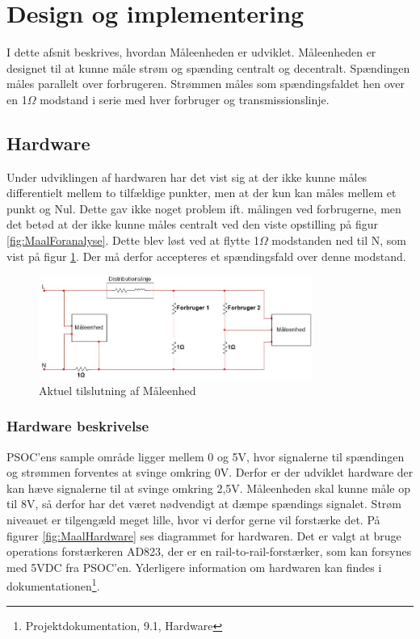 
\section{Design og implementering}
I dette afsnit beskrives, hvordan Måleenheden er udviklet. Måleenheden er designet til at kunne måle strøm og spænding centralt og decentralt. Spændingen måles parallelt over forbrugeren. Strømmen måles som spændingsfaldet hen over en 1$\Omega$ modstand i serie med hver forbruger og transmissionslinje. 

\subsection{Hardware}

Under udviklingen af hardwaren har det vist sig at der ikke kunne måles differentielt mellem to tilfældige punkter, men at der kun kan måles mellem et punkt og Nul. Dette gav ikke noget problem ift. målingen ved forbrugerne, men det betød at der ikke kunne måles centralt ved den viste opstilling på figur \ref{fig:MaalForanalyse}. Dette blev løst ved at flytte 1$\Omega$ modstanden ned til N, som vist på figur \ref{fig:MaalAktuel}. Der må derfor accepteres et spændingsfald over denne modstand.

\begin{figure}[H] %
	\centering
	\includegraphics[width=0.8\textwidth]{figure/MaalAktuel}
	\caption{Aktuel tilslutning af Måleenhed}
	\label{fig:MaalAktuel}
\end{figure} 


\subsubsection{Hardware beskrivelse}
PSOC'ens sample område ligger mellem 0 og 5V, hvor signalerne til spændingen og strømmen forventes at svinge omkring 0V. Derfor er der udviklet hardware der kan hæve signalerne til at svinge omkring 2,5V. Måleenheden skal kunne måle op til 8V, så derfor har det været nødvendigt at dæmpe spændings signalet. Strøm niveauet er tilgengæld meget lille, hvor vi derfor gerne vil forstærke det. På figurer \ref{fig:MaalHardware} ses diagrammet for hardwaren. Det er valgt at bruge operations forstærkeren AD823, der er en rail-to-rail-forstærker, som kan forsynes med 5VDC fra PSOC'en. Yderligere information om hardwaren kan findes i dokumentationen\footnote{Projektdokumentation, 9.1, Hardware}.  
  


